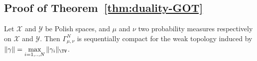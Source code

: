 \subsection{Proof of Theorem~\ref{thm:duality-GOT}}




\begin{lemma}
\label{lem:compact-weak}
Let $\mathcal{X}$ and $\mathcal{Y}$ be Polish spaces, and $\mu$ and $\nu$ two probability measures respectively on  $\mathcal{X}$ and $\mathcal{Y}$. Then $\Gamma^N_{\mu,\nu}$  is sequentially compact for the weak topology induced by $\Vert \gamma \Vert = \max\limits_{i=1,..,N} \Vert \gamma_i\Vert_{\TV}$. 
\end{lemma}


